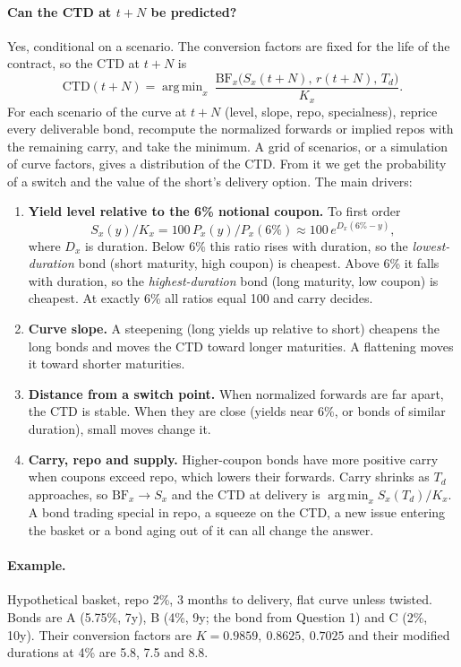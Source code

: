 \documentclass[11pt]{article}
\DeclareMathOperator*{\argmin}{arg\,min}
\newcommand{\BF}{\mathrm{BF}}
\begin{document}
\paragraph{Can the CTD at $t+N$ be predicted?}
Yes, conditional on a scenario. The conversion factors are fixed for the life of the contract, so the CTD at $t+N$ is
\[
\text{CTD}(t+N)=\argmin_{x}\ \frac{\BF_x\bigl(S_x(t+N),\,r(t+N),\,T_d\bigr)}{K_x}.
\]
For each scenario of the curve at $t+N$ (level, slope, repo, specialness), reprice every deliverable bond, recompute the normalized forwards or implied repos with the remaining carry, and take the minimum. A grid of scenarios, or a simulation of curve factors, gives a distribution of the CTD. From it we get the probability of a switch and the value of the short's delivery option. The main drivers:
\begin{enumerate}[leftmargin=*]
\item \textbf{Yield level relative to the 6\% notional coupon.} To first order\[S_x(y)/K_x=100\,P_x(y)/P_x(6\%)\approx100\,e^{D_x(6\%-y)},\]where $D_x$ is duration. Below 6\% this ratio rises with duration, so the \emph{lowest-duration} bond (short maturity, high coupon) is cheapest. Above 6\% it falls with duration, so the \emph{highest-duration} bond (long maturity, low coupon) is cheapest. At exactly 6\% all ratios equal 100 and carry decides.
\item \textbf{Curve slope.} A steepening (long yields up relative to short) cheapens the long bonds and moves the CTD toward longer maturities. A flattening moves it toward shorter maturities.
\item \textbf{Distance from a switch point.} When normalized forwards are far apart, the CTD is stable. When they are close (yields near 6\%, or bonds of similar duration), small moves change it.
\item \textbf{Carry, repo and supply.} Higher-coupon bonds have more positive carry when coupons exceed repo, which lowers their forwards. Carry shrinks as $T_d$ approaches, so $\BF_x\to S_x$ and the CTD at delivery is $\argmin_x S_x(T_d)/K_x$. A bond trading special in repo, a squeeze on the CTD, a new issue entering the basket or a bond aging out of it can all change the answer.
\end{enumerate}

\paragraph{Example.}
Hypothetical basket, repo 2\%, 3 months to delivery, flat curve unless twisted. Bonds are A (5.75\%, 7y), B (4\%, 9y; the bond from Question 1) and C (2\%, 10y). Their conversion factors are $K=0.9859,\ 0.8625,\ 0.7025$ and their modified durations at 4\% are 5.8, 7.5 and 8.8.
\end{document}
